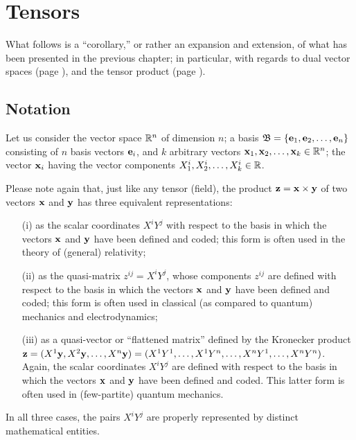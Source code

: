 \chapter{Tensors}
\label{ch:t}


What follows is a ``corollary,'' or rather an expansion and extension,
of what has been presented in the previous chapter; in particular, with regards to dual vector spaces
(page
\pageref{2011-m-dvs}),
and the tensor product
(page
\pageref{2011-m-tensorp}).

\section{Notation}

Let us consider the vector space ${\Bbb R}^n$ of dimension $n$;
a basis
${\mathfrak B}=\{{\bf e}_1,{\bf e}_2,\ldots ,{\bf e}_n\}$ consisting of
$n$ basis vectors ${\bf e}_i$,
and $k$ arbitrary vectors
${\bf x}_1,{\bf x}_2,\ldots ,{\bf x}_k\in {\Bbb R}^n$;
the vector ${\bf x}_i$ having the vector components
$X^i_1,X^i_2,\ldots ,X^i_k\in {\Bbb R}$.


Please note again that,
just like any tensor (field), the product
${\bf z} = {\bf x} \times {\bf y}$   of two vectors ${\bf x}$ and ${\bf y}$   has three equivalent  representations:
\begin{itemize}
\item[(i)]
as the scalar coordinates $X^iY^j$ with respect to the basis in which the vectors ${\bf  x}$ and ${\bf y}$ have been defined and coded;
this form is often used in the theory of (general) relativity;
\item[(ii)]
as the quasi-matrix $z^{ij}  =X^iY^j$, whose components $z^{ij}$ are
defined with respect to the basis in which the vectors ${\bf  x}$ and ${\bf y}$ have been defined and coded;
this form is often used in classical (as compared to quantum) mechanics and electrodynamics;
\item[(iii)]
as a quasi-vector or ``flattened matrix'' defined by the Kronecker product
${\bf z} = (X^1  {\bf y}, X^2  {\bf y}, \ldots , X^n  {\bf y})=
(X^1  { Y}^1, \ldots ,X^1  { Y}^n, \ldots  ,X^n  { Y}^1, \ldots , X^n  { Y}^n)
$. Again, the scalar coordinates $X^iY^j$ are defined
with respect to the basis in which the vectors ${\bf  x}$ and ${\bf y}$ have been defined and coded.
This latter form is often used in (few-partite) quantum mechanics.
\end{itemize}
In all three cases, the pairs $X^iY^j$  are properly represented by distinct mathematical entities.


